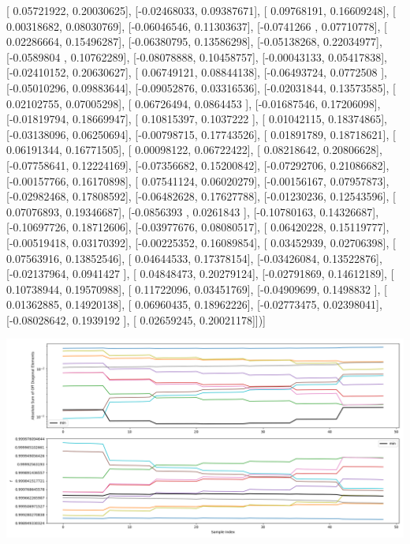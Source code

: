 \documentclass{article}
\begin{document}
       [ 0.05721922,  0.20030625],
       [-0.02468033,  0.09387671],
       [ 0.09768191,  0.16609248],
       [ 0.00318682,  0.08030769],
       [-0.06046546,  0.11303637],
       [-0.0741266 ,  0.07710778],
       [ 0.02286664,  0.15496287],
       [-0.06380795,  0.13586298],
       [-0.05138268,  0.22034977],
       [-0.0589804 ,  0.10762289],
       [-0.08078888,  0.10458757],
       [-0.00043133,  0.05417838],
       [-0.02410152,  0.20630627],
       [ 0.06749121,  0.08844138],
       [-0.06493724,  0.0772508 ],
       [-0.05010296,  0.09883644],
       [-0.09052876,  0.03316536],
       [-0.02031844,  0.13573585],
       [ 0.02102755,  0.07005298],
       [ 0.06726494,  0.0864453 ],
       [-0.01687546,  0.17206098],
       [-0.01819794,  0.18669947],
       [ 0.10815397,  0.1037222 ],
       [ 0.01042115,  0.18374865],
       [-0.03138096,  0.06250694],
       [-0.00798715,  0.17743526],
       [ 0.01891789,  0.18718621],
       [ 0.06191344,  0.16771505],
       [ 0.00098122,  0.06722422],
       [ 0.08218642,  0.20806628],
       [-0.07758641,  0.12224169],
       [-0.07356682,  0.15200842],
       [-0.07292706,  0.21086682],
       [-0.00157766,  0.16170898],
       [ 0.07541124,  0.06020279],
       [-0.00156167,  0.07957873],
       [-0.02982468,  0.17808592],
       [-0.06482628,  0.17627788],
       [-0.01230236,  0.12543596],
       [ 0.07076893,  0.19346687],
       [-0.0856393 ,  0.0261843 ],
       [-0.10780163,  0.14326687],
       [-0.10697726,  0.18712606],
       [-0.03977676,  0.08080517],
       [ 0.06420228,  0.15119777],
       [-0.00519418,  0.03170392],
       [-0.00225352,  0.16089854],
       [ 0.03452939,  0.02706398],
       [ 0.07563916,  0.13852546],
       [ 0.04644533,  0.17378154],
       [-0.03426084,  0.13522876],
       [-0.02137964,  0.0941427 ],
       [ 0.04848473,  0.20279124],
       [-0.02791869,  0.14612189],
       [ 0.10738944,  0.19570988],
       [ 0.11722096,  0.03451769],
       [-0.04909699,  0.1498832 ],
       [ 0.01362885,  0.14920138],
       [ 0.06960435,  0.18962226],
       [-0.02773475,  0.02398041],
       [-0.08028642,  0.1939192 ],
       [ 0.02659245,  0.20021178]])]
\begin{center}
\includegraphics[scale=.9]{report_pickled_controls120/control_dpn_all.png}

\end{center}
\end{document}
